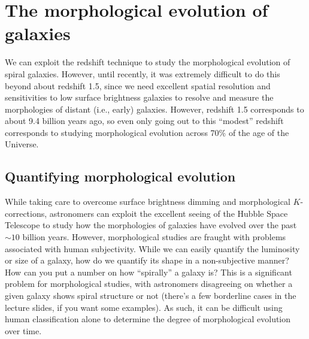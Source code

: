 \documentclass[11pt]{article}
\begin{document}
\section{The morphological evolution of galaxies}
We can exploit the redshift technique to study the morphological
evolution of spiral galaxies. However, until recently, it was extremely
difficult to do this beyond about redshift 1.5, since we need
excellent spatial resolution and sensitivities to low surface
brightness galaxies to resolve and measure the morphologies of distant
(i.e., early) galaxies. However, redshift 1.5 corresponds to about 9.4
billion years ago, so even only going out to this ``modest'' redshift
corresponds to studying morphological evolution across 70\% of the age
of the Universe.

\subsection{Quantifying morphological evolution}
While taking care to overcome surface brightness dimming and
morphological $K$-corrections, astronomers can exploit the excellent
seeing of the Hubble Space Telescope to study how the morphologies of
galaxies have evolved over the past $\sim10$ billion years. However,
morphological studies are fraught with problems associated with human
subjectivity. While we can easily quantify the luminosity or size of a
galaxy, how do we quantify its shape in a non-subjective manner? How
can you put a number on how ``spirally'' a galaxy is? This is a
significant problem for morphological studies, with astronomers
disagreeing on whether a given galaxy shows spiral structure or not
(there's a few borderline cases in the lecture slides, if you want some
examples). As such, it can be difficult using human classification
alone to determine the degree of morphological evolution over time.
\end{document}

